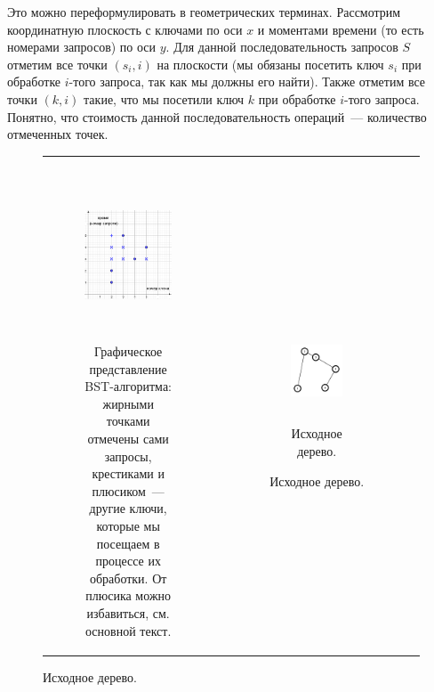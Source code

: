 Это можно переформулировать в геометрических терминах. Рассмотрим координатную
плоскость с ключами по оси $x$ и моментами времени (то есть номерами запросов) по
оси $y$. Для данной последовательность запросов $S$ отметим все точки $(s_i, i)$
на плоскости (мы обязаны посетить ключ $s_i$ при обработке $i$-того
запроса, так как мы должны его найти). Также отметим все точки $(k, i)$ такие,
что мы посетили ключ $k$ при обработке $i$-того запроса. Понятно, что стоимость данной
последовательность операций~--- количество отмеченных точек.



\begin{figure}
	\centering
	\begin{tabular}{cc}

		\begin{subfigure}{0.6\textwidth}
			\centering
			\includegraphics[height=5cm]{img/graph_repr_example.png}
			\caption{Графическое представление BST-алгоритма: жирными точками отмечены сами запросы, крестиками и плюсиком~--- другие ключи, которые мы посещаем в процессе их обработки. От плюсика можно избавиться, см. основной текст.}
			\label{repr_example_graph}
		\end{subfigure}

		 &

		\begin{subfigure}{0.4\textwidth}
			\centering
			\begin{subfigure}{0.4\textwidth}
				\includegraphics[height=3cm]{img/tree_original.png}
				\caption{Исходное дерево.}
				\label{repr_example_orig}
			\end{subfigure}


\end{subfigure}
\end{tabular}
\end{figure}
